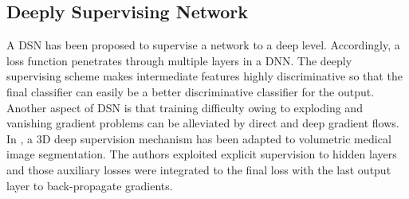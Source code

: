 \documentclass[journal]{IEEEtran}
\begin{document}
\subsection{Deeply Supervising Network}
A DSN \cite{lee2015deeply} has been proposed to supervise a network to a deep level. Accordingly, a loss function penetrates through multiple layers in a DNN. The deeply supervising scheme makes intermediate features highly discriminative so that the final classifier can easily be a better discriminative classifier for the output. Another aspect of DSN is that training difficulty owing to exploding and vanishing gradient problems can be alleviated by direct and deep gradient flows. In \cite{dou20173d}, a 3D deep supervision mechanism has been adapted to volumetric medical image segmentation. The authors exploited explicit supervision to hidden layers and those auxiliary losses were integrated to the final loss with the last output layer to back-propagate gradients.
\end{document}
